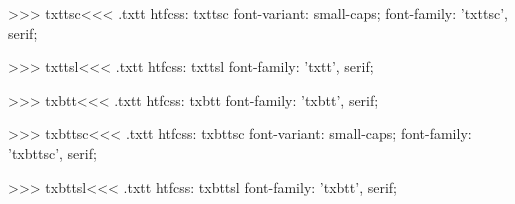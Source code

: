 >>>
\<txttsc\><<<
.txtt
htfcss:  txttsc  font-variant: small-caps; font-family: 'txttsc', serif;

>>>
\<txttsl\><<<
.txtt
htfcss:  txttsl  font-family: 'txtt', serif;

>>>
\<txbtt\><<<
.txtt
htfcss:  txbtt  font-family: 'txbtt', serif;

>>>
\<txbttsc\><<<
.txtt
htfcss:  txbttsc  font-variant: small-caps; font-family: 'txbttsc', serif;

>>>
\<txbttsl\><<<
.txtt
htfcss:  txbttsl  font-family: 'txbtt', serif;

